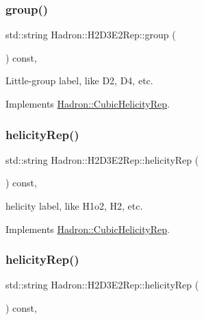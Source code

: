 \subsubsection{\texorpdfstring{group()}{group()}\hspace{0.1cm}{\footnotesize\ttfamily [5/5]}}
{\footnotesize\ttfamily std\+::string Hadron\+::\+H2\+D3\+E2\+Rep\+::group (\begin{DoxyParamCaption}{ }\end{DoxyParamCaption}) const\hspace{0.3cm}{\ttfamily [inline]}, {\ttfamily [virtual]}}

Little-\/group label, like D2, D4, etc. 

Implements \mbox{\hyperlink{structHadron_1_1CubicHelicityRep_a101a7d76cd8ccdad0f272db44b766113}{Hadron\+::\+Cubic\+Helicity\+Rep}}.

\mbox{\label{structHadron_1_1H2D3E2Rep_af42edde155e8d26e4f67fa592d7023d0}} 
\subsubsection{\texorpdfstring{helicityRep()}{helicityRep()}\hspace{0.1cm}{\footnotesize\ttfamily [1/3]}}
{\footnotesize\ttfamily std\+::string Hadron\+::\+H2\+D3\+E2\+Rep\+::helicity\+Rep (\begin{DoxyParamCaption}{ }\end{DoxyParamCaption}) const\hspace{0.3cm}{\ttfamily [inline]}, {\ttfamily [virtual]}}

helicity label, like H1o2, H2, etc. 

Implements \mbox{\hyperlink{structHadron_1_1CubicHelicityRep_af1096946b7470edf0a55451cc662f231}{Hadron\+::\+Cubic\+Helicity\+Rep}}.

\mbox{\label{structHadron_1_1H2D3E2Rep_af42edde155e8d26e4f67fa592d7023d0}} 
\subsubsection{\texorpdfstring{helicityRep()}{helicityRep()}\hspace{0.1cm}{\footnotesize\ttfamily [2/3]}}
{\footnotesize\ttfamily std\+::string Hadron\+::\+H2\+D3\+E2\+Rep\+::helicity\+Rep (\begin{DoxyParamCaption}{ }\end{DoxyParamCaption}) const\hspace{0.3cm}{\ttfamily [inline]}, {\ttfamily [virtual]}}

